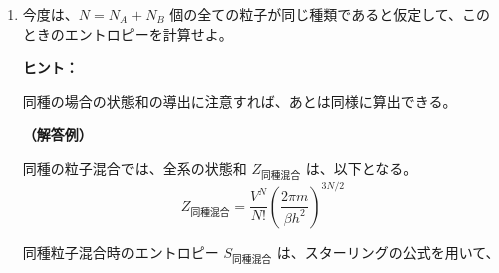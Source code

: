 \documentclass[uplatex,dvipdfmx,a4paper,11pt]{jsarticle}
\begin{document}
\begin{enumerate}
\begin{align*}
S_{\text{異種混合}}
	&= \dfrac{3}{2} N_A k_B + k_B \ln \left[ \dfrac{V^{N_A}}{N_A^{N_A} e^{-N_A}}\left(\dfrac{2 \pi m}{\beta h^2} \right)^{3 N_A /2} \right] \\
	&\quad + \dfrac{3}{2} N_B k_B + k_B \ln \left[ \dfrac{V^{N_B}}{N_B^{N_B} e^{-N_B}}\left(\dfrac{2 \pi m}{\beta h^2} \right)^{3 N_B /2} \right] \\
	&= \dfrac{5}{2} N_A k_B + N_A k_B \ln \left[ \dfrac{V}{N_A}\left(\dfrac{2 \pi m}{\beta h^2} \right)^{3/2} \right] \\ 
	&\quad + \dfrac{5}{2} N_B k_B + N_B k_B \ln \left[ \dfrac{V}{N_B}\left(\dfrac{2 \pi m}{\beta h^2} \right)^{3/2} \right] \\
	&= \dfrac{5}{2} N k_B + N_A k_B \ln \left[ \dfrac{V}{N_A}\left(\dfrac{2 \pi m}{\beta h^2} \right)^{3/2} \right] 
	+ N_B k_B \ln \left[ \dfrac{V}{N_B}\left(\dfrac{2 \pi m}{\beta h^2} \right)^{3/2} \right] 
\end{align*}
となる。

なお、二行目への展開は、対数の性質を利用している
\footnote{
対数の性質に関する参考事項：\href{http://kisokouza.island.ac/documents/Math_Basic.pdf}{「初等関数に関するメモ」の「4.1.1 対数関数の公式」} \\
カノニカル集団での理想気体に関する参考事項：\href{http://kisokouza.island.ac/documents/Cannonical_Ideal_Gas.pdf}{「カノニカル集団での理想気体」の「1.1.1 ヘルムホルツの自由エネルギーからの展開」}
}。

\newpage

\item
今度は、$N = N_A + N_B$ 個の全ての粒子が同じ種類であると仮定して、このときのエントロピーを計算せよ。
\vspace{8pt}
\begin{itembox}[l]{{\bf ヒント：}}

同種の場合の状態和の導出に注意すれば、あとは同様に算出できる。

\end{itembox}
\vspace{8pt}

{\bf （解答例）}
 
同種の粒子混合では、全系の状態和 $Z_{\text{同種混合}}$ は、以下となる。
\begin{equation*}
Z_{\text{同種混合}} = \dfrac{V^{N}}{N!}\left(\dfrac{2 \pi m}{\beta h^2} \right)^{3 N/2}
\end{equation*}

同種粒子混合時のエントロピー $S_{\text{同種混合}}$ は、スターリングの公式を用いて、


\end{enumerate}
\end{document}
